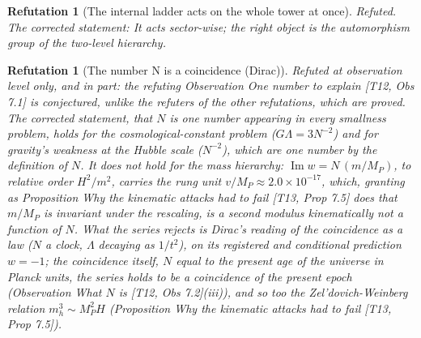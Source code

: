 \documentclass[11pt]{article}
\newtheorem{refutation}[theorem]{Refutation}
\theoremstyle{definition}
\theoremstyle{plain}
\newcommand{\changedmark}[2]{\marginpar{\raggedright\scriptsize\color{#1}#2}}
\begin{document}
\begin{refutation}[The internal ladder acts on the whole tower at once]\label{c:refuted.the-internal-ladder-acts-on-the-whole-tower-at-o}
Refuted. The corrected statement: It acts sector-wise; the right object is the automorphism group of the two-level hierarchy.
\end{refutation}

\begin{refutation}[The number N is a coincidence (Dirac)]\label{c:refuted.the-number-n-is-a-coincidence-dirac}
\changedmark{BrickRed}{corrected since the deposit}
Refuted at observation level only, and in part: the refuting Observation \emph{One number to explain} [T12, Obs 7.1] is conjectured, unlike the refuters of the other refutations, which are proved. The corrected statement, that $N$ is one number appearing in every smallness problem, holds for the cosmological-constant problem ($G\Lambda = 3N^{-2}$) and for gravity's weakness at the Hubble scale ($N^{-2}$), which are one number by the definition of $N$. It does not hold for the mass hierarchy: $\operatorname{Im} w = N\,(m/M_{P})$, to relative order $H^{2}/m^{2}$, carries the rung unit $v/M_{P} \approx 2.0 \times 10^{-17}$, which, granting as Proposition \emph{Why the kinematic attacks had to fail} [T13, Prop 7.5] does that $m/M_{P}$ is invariant under the rescaling, is a second modulus kinematically not a function of $N$. What the series rejects is Dirac's reading of the coincidence as a law ($N$ a clock, $\Lambda$ decaying as $1/t^{2}$), on its registered and conditional prediction $w = -1$; the coincidence itself, $N$ equal to the present age of the universe in Planck units, the series holds to be a coincidence of the present epoch (Observation \emph{What $N$ is} [T12, Obs 7.2](iii)), and so too the Zel'dovich-Weinberg relation $m_{h}^{3} \sim M_{P}^{2}H$ (Proposition \emph{Why the kinematic attacks had to fail} [T13, Prop 7.5]).
\end{refutation}
\end{document}
